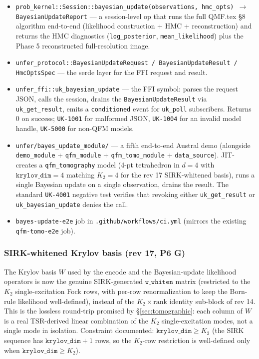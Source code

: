 \documentclass[11pt, a4paper]{article}
\begin{document}
\begin{itemize}
\item \texttt{prob\_kernel::Session::bayesian\_update(observations, hmc\_opts)
  $\to$ BayesianUpdateReport} --- a session-level op that runs the
  full QMF.tex \S8 algorithm end-to-end (likelihood construction
  + HMC + reconstruction) and returns the HMC diagnostics
  (\texttt{log\_posterior}, \texttt{mean\_likelihood}) plus the
  Phase 5 reconstructed full-resolution image.
\item \texttt{unfer\_protocol::BayesianUpdateRequest /
  BayesianUpdateResult / HmcOptsSpec} --- the serde layer for
  the FFI request and result.
\item \texttt{unfer\_ffi::uk\_bayesian\_update} --- the FFI
  symbol: parses the request JSON, calls the session, drains the
  \texttt{BayesianUpdateResult} via \texttt{uk\_get\_result},
  emits a \texttt{conditioned} event for \texttt{uk\_poll}
  subscribers. Returns 0 on success; \texttt{UK-1001} for
  malformed JSON, \texttt{UK-1004} for an invalid model handle,
  \texttt{UK-5000} for non-QFM models.
\item \texttt{unfer/bayes\_update\_module/} --- a fifth end-to-end
  Austral demo (alongside \texttt{demo\_module} +
  \texttt{qfm\_module} + \texttt{qfm\_tomo\_module} +
  \texttt{data\_source}). JIT-creates a \texttt{qfm\_tomography}
  model (4-pt tetrahedron in $d=4$ with $\texttt{krylov\_dim}=4$
  matching $K_2=4$ for the rev 17 SIRK-whitened basis), runs a
  single Bayesian update on a single observation, drains the
  result. The standard \texttt{UK-4001} negative test verifies
  that revoking either \texttt{uk\_get\_result} or
  \texttt{uk\_bayesian\_update} denies the call.
\item \texttt{bayes-update-e2e} job in
  \texttt{.github/workflows/ci.yml} (mirrors the existing
  \texttt{qfm-tomo-e2e} job).
\end{itemize}

\subsubsection*{SIRK-whitened Krylov basis (rev 17, P6 G)}

The Krylov basis $W$ used by the encode and the Bayesian-update
likelihood operators is now the genuine SIRK-generated
$\texttt{w\_whiten}$ matrix (restricted to the $K_2$
single-excitation Fock rows, with per-row renormalization to keep
the Born-rule likelihood well-defined), instead of the
$K_2 \times \mathrm{rank}$ identity sub-block of rev 14. This is
the lossless round-trip promised by \S\ref{sec:tomographic}: each
column of $W$ is a real TSR-derived linear combination of the
$K_2$ single-excitation modes, not a single mode in isolation.
Constraint documented: $\texttt{krylov\_dim} \ge K_2$ (the SIRK
sequence has $\texttt{krylov\_dim}+1$ rows, so the $K_2$-row
restriction is well-defined only when
$\texttt{krylov\_dim} \ge K_2$).
\end{document}
